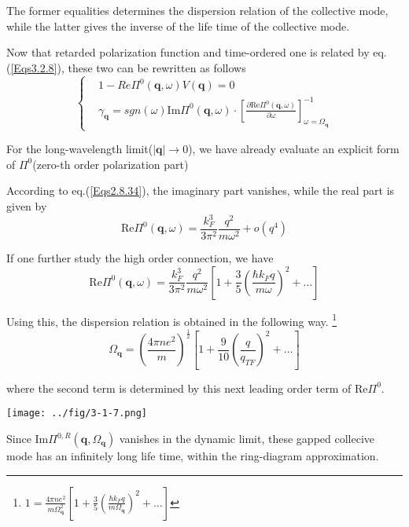 The former equalities determines the dispersion relation of the collective mode, while the latter gives the inverse of the life time of the collective mode.

Now that retarded polarization function and time-ordered one is related by eq.(\ref{Eqs3.2.8}), these two can be rewritten as follows
\begin{equation*} \label{Eqs3.2.12'} \tag{3.2.12'}
\left\{ \begin{split}
&1- Re\Pi^{0}(\mathbf{q},\omega) V(\mathbf{q}) = 0\\
&\gamma_{\mathbf{q}} = sgn(\omega) \text{Im} \Pi^{0}(\mathbf{q},\omega) \cdot 
 \left[ \frac{\partial \text{Re} \Pi^{0}(\mathbf{q},\omega)}{\partial \omega} \right]_{\omega=\Omega_{\mathbf{q}}}^{-1}
\end{split} \right.
\end{equation*}

For the long-wavelength limit($|\mathbf{q}| \rightarrow 0$), we have already evaluate an explicit form of $\Pi^0$(zero-th order polarization part)

According to eq.(\ref{Eqs2.8.34}), the imaginary part vanishes, while the real part is given by
\[\text{Re} \Pi^0(\mathbf{q},\omega) = \frac{k_F^3}{3\pi^2}\frac{q^2}{m\omega^2} + o(q^4)\]

If one further study the high order connection, we have
\[\text{Re} \Pi^0(\mathbf{q},\omega) = \frac{k_F^3}{3\pi^2}\frac{q^2}{m\omega^2}\left[ 1+\frac{3}{5}\left( \frac{\hbar k_F q}{m \omega} \right)^2+\ldots \right]\]

Using this, the dispersion relation is obtained in the following way.
\footnote{$1 = \frac{4\pi n e^2}{m \Omega_{\mathbf{q}}^2}\left[ 1+\frac{3}{5}\left( \frac{\hbar k_F q}{m \Omega_{\mathbf{q}}} \right)^2+\ldots \right]$}
\begin{equation} \label{Eqs3.2.13}
\Omega_{\mathbf{q}} = \left(\frac{4\pi n e^2}{m}\right)^{\frac{1}{2}}\left[ 1+\frac{9}{10}\left( \frac{q}{q_{TF}} \right)^2+\ldots \right]
\end{equation}

where the second term is determined by this next leading order term of $\text{Re} \Pi^0$.

\begin{center} \label{Fig3.1.7}
\texttt{[image: ../fig/3-1-7.png]}
\end{center}

Since $\text{Im} \Pi^{0,R}(\mathbf{q},\Omega_{\mathbf{q}})$ vanishes in the dynamic limit, these gapped collecive mode has an infinitely long life time, within the ring-diagram approximation.

